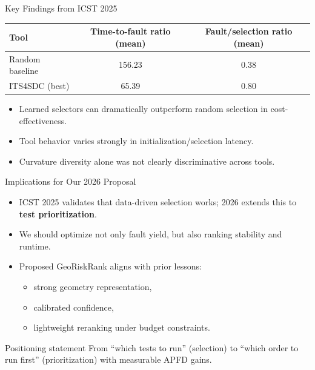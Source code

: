 ﻿\documentclass[10pt,aspectratio=169]{beamer}
\begin{document}
\begin{frame}{Key Findings from ICST 2025}
\small
\begin{table}
\centering
\begin{tabular}{lcc}
\toprule
Tool & Time-to-fault ratio (mean) & Fault/selection ratio (mean) \\
\midrule
Random baseline & 156.23 & 0.38 \\
ITS4SDC (best) & 65.39 & 0.80 \\
\bottomrule
\end{tabular}
\end{table}
\vspace{0.1cm}
\begin{itemize}
  \item Learned selectors can dramatically outperform random selection in cost-effectiveness.
  \item Tool behavior varies strongly in initialization/selection latency.
  \item Curvature diversity alone was not clearly discriminative across tools.
\end{itemize}
\end{frame}

\begin{frame}{Implications for Our 2026 Proposal}
\begin{itemize}
  \item ICST 2025 validates that data-driven selection works; 2026 extends this to \textbf{test prioritization}.
  \item We should optimize not only fault yield, but also ranking stability and runtime.
  \item Proposed GeoRiskRank aligns with prior lessons:
  \begin{itemize}
    \item strong geometry representation,
    \item calibrated confidence,
    \item lightweight reranking under budget constraints.
  \end{itemize}
\end{itemize}
\vspace{0.2cm}
\begin{block}{Positioning statement}
\small From ``which tests to run'' (selection) to ``which order to run first'' (prioritization) with measurable APFD gains.
\end{block}
\end{frame}
\end{document}
